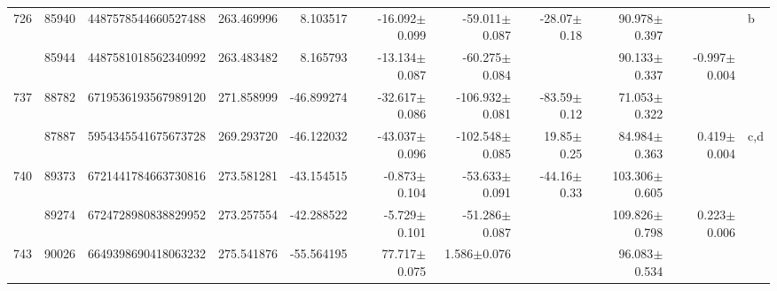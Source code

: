 \documentclass{ws-ijmpd}
\begin{document}
\begin{landscape}
\begin{longtable}{rrrrrrrrrrl}
 \hline 726 &   85940 &      4487578544660527488 &                   263.469996 &                     8.103517 &                -16.092$\pm$0.099 &                -59.011$\pm$0.087 &         -28.07$\pm$  0.18 &        90.978$\pm$0.397 &                                           &                                                  b \\
            &   85944 &      4487581018562340992 &                   263.483482 &                     8.165793 &                -13.134$\pm$0.087 &                -60.275$\pm$0.084 &                           &        90.133$\pm$0.337 &                          -0.997$\pm$0.004 &                                                    \\
 \hline 737 &   88782 &      6719536193567989120 &                   271.858999 &                   -46.899274 &                -32.617$\pm$0.086 &               -106.932$\pm$0.081 &         -83.59$\pm$  0.12 &        71.053$\pm$0.322 &                                           &                                                    \\
            &   87887 &      5954345541675673728 &                   269.293720 &                   -46.122032 &                -43.037$\pm$0.096 &               -102.548$\pm$0.085 &          19.85$\pm$  0.25 &        84.984$\pm$0.363 &                           0.419$\pm$0.004 &                                                c,d \\
 \hline 740 &   89373 &      6721441784663730816 &                   273.581281 &                   -43.154515 &                 -0.873$\pm$0.104 &                -53.633$\pm$0.091 &         -44.16$\pm$  0.33 &       103.306$\pm$0.605 &                                           &                                                    \\
            &   89274 &      6724728980838829952 &                   273.257554 &                   -42.288522 &                 -5.729$\pm$0.101 &                -51.286$\pm$0.087 &                           &       109.826$\pm$0.798 &                           0.223$\pm$0.006 &                                                    \\
 \hline 743 &   90026 &      6649398690418063232 &                   275.541876 &                   -55.564195 &                 77.717$\pm$0.075 &                  1.586$\pm$0.076 &                           &        96.083$\pm$0.534 &                                           &                                                    \\

\end{longtable}
\end{landscape}
\end{document}
